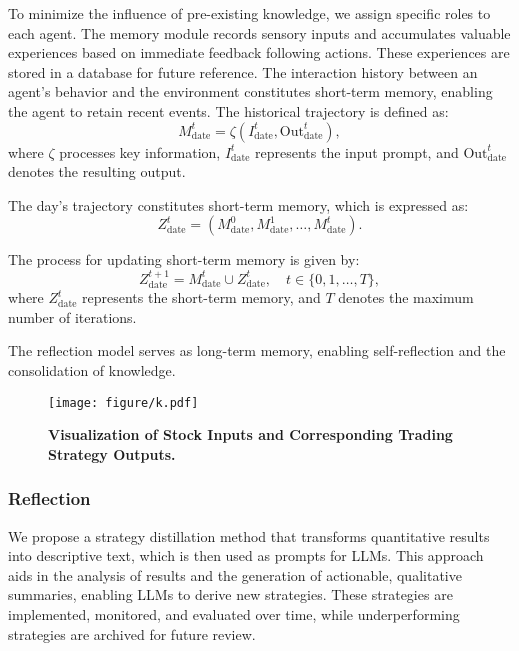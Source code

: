 To minimize the influence of pre-existing knowledge, we assign specific roles to each agent. The memory module records sensory inputs and accumulates valuable experiences based on immediate feedback following actions. These experiences are stored in a database for future reference. The interaction history between an agent's behavior and the environment constitutes short-term memory, enabling the agent to retain recent events. The historical trajectory is defined as:
\begin{equation}\label{Eq1}
 	M_{\mathrm{date}}^t = \zeta \left(I_{\mathrm{date}}^t, \mathrm{Out}_{\mathrm{date}}^t \right),
\end{equation}
where $\zeta$ processes key information, $I_{\mathrm{date}}^t$ represents the input prompt, and $\mathrm{Out}_{\mathrm{date}}^t$ denotes the resulting output.

The day's trajectory constitutes short-term memory, which is expressed as:
\begin{equation}\label{Eq2}
 	Z_{\mathrm{date}}^t = \left(M_{\mathrm{date}}^0, M_{\mathrm{date}}^1, \dots, M_{\mathrm{date}}^t\right).
\end{equation}

The process for updating short-term memory is given by:
\begin{equation}\label{Eq3}
 	Z_{\mathrm{date}}^{t + 1} = M_{\mathrm{date}}^t \cup Z_{\mathrm{date}}^t, \quad t \in \{0,1,\dots,T\},
\end{equation}
where $Z_{\mathrm{date}}^t$ represents the short-term memory, and $T$ denotes the maximum number of iterations.

The reflection model serves as long-term memory, enabling self-reflection and the consolidation of knowledge. 



\begin{figure*}
	\centering
	\texttt{[image: figure/k.pdf]}
	\caption{\textbf{Visualization of Stock Inputs and Corresponding Trading Strategy Outputs.}}
	\label{fig:withphoto}
\end{figure*}

\subsubsection{Reflection}
\label{appendix_reflection}

We propose a strategy distillation method that transforms quantitative results into descriptive text, which is then used as prompts for LLMs. This approach aids in the analysis of results and the generation of actionable, qualitative summaries, enabling LLMs to derive new strategies. These strategies are implemented, monitored, and evaluated over time, while underperforming strategies are archived for future review.

